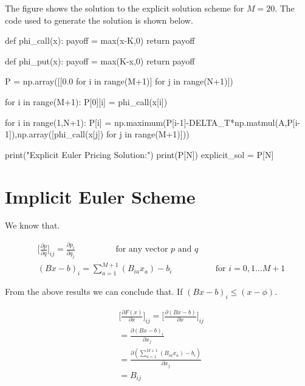 \documentclass[12pt]{report}
\begin{document}
The figure shows the solution to the explicit solution scheme for $M=20$. The code used to generate the solution is shown below.

\begin{python}
def phi_call(x):
 payoff = max(x-K,0)
 return payoff

def phi_put(x):
 payoff = max(K-x,0) 
 return payoff

P = np.array([[0.0 for i in range(M+1)] for j in range(N+1)])

for i in range(M+1):
 P[0][i] = phi_call(x[i])


for i in range(1,N+1):
 P[i] = np.maximum(P[i-1]-DELTA_T*np.matmul(A,P[i-1]),np.array([phi_call(x[j]) for j in range(M+1)])) 

print("Explicit Euler Pricing Solution:")
print(P[N])
explicit_sol = P[N]
\end{python}

\section*{Implicit Euler Scheme}

We know that.

\begin{equation*}
	\begin{aligned}
		&\Bigg[\frac{\partial p}{\partial q}\Bigg]_{ij} = \frac{\partial p_i}{\partial q_j}  \hspace{2cm} \text{for any vector $p$ and $q$} \\
		& (Bx-b)_i = \sum_{a=1}^{M+1}(B_{ia}x_a)-b_i\hspace{2cm} \text{ for $i=0,1...M+1$}
	\end{aligned}
\end{equation*}

From the above results we can conclude that. If $(Bx-b)_i \leq (x-\phi)$.

\begin{equation*}
	\begin{aligned}
		& \Bigg[\frac{\partial F(x)}{\partial x} \Bigg]_{ij} = \Bigg[\frac{\partial (Bx-b)}{\partial x} \Bigg]_{ij} \\
		&= \frac{\partial (Bx-b)_i}{\partial x_j} \\
		&= \frac{\partial (\sum_{a=1}^{M+1}(B_{ia}x_a)-b_i)}{\partial x_j}\\
		&=B_{ij}
	\end{aligned}
\end{equation*}
\end{document}
